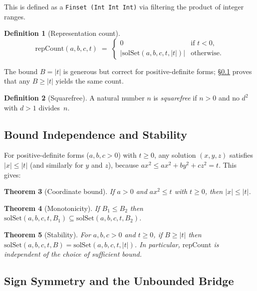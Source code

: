 \documentclass[11pt,a4paper]{article}
\newtheorem{theorem}{Theorem}[section]
\theoremstyle{definition}
\newtheorem{definition}[theorem]{Definition}
\newcommand{\lean}[1]{\texttt{#1}}
\newcommand{\solSet}{\mathrm{solSet}}
\newcommand{\repCount}{\mathrm{repCount}}
\begin{document}
This is defined as a \lean{Finset (Int \texttimes{} Int \texttimes{} Int)}
via filtering the product of integer ranges.

\begin{definition}[Representation count]\label{def:repcount}
\[
  \repCount(a,b,c,t) \;=\;
  \begin{cases}
    0 & \text{if } t < 0,\\
    \bigl|\solSet(a,b,c,t,|t|)\bigr| & \text{otherwise.}
  \end{cases}
\]
\end{definition}

The bound $B = |t|$ is generous but correct for positive-definite
forms; \S\ref{sec:s2} proves that any $B \ge |t|$ yields the same
count.

\begin{definition}[Squarefree]\label{def:sqfree}
A natural number $n$ is \emph{squarefree} if $n > 0$ and no
$d^2$ with $d > 1$ divides~$n$.
\end{definition}

\subsection{Bound Independence and Stability}\label{sec:s2}

For positive-definite forms ($a, b, c > 0$) with $t \ge 0$, any
solution $(x,y,z)$ satisfies $|x| \le |t|$ (and similarly for $y$
and $z$), because $ax^2 \le ax^2 + by^2 + cz^2 = t$.  This gives:

\begin{theorem}[Coordinate bound]\label{thm:coord-bound}
If $a > 0$ and $ax^2 \le t$ with $t \ge 0$, then $|x| \le |t|$.
\end{theorem}

\begin{theorem}[Monotonicity]\label{thm:mono}
If $B_1 \le B_2$ then
$\solSet(a,b,c,t,B_1) \subseteq \solSet(a,b,c,t,B_2)$.
\end{theorem}

\begin{theorem}[Stability]\label{thm:stable}
For $a, b, c > 0$ and $t \ge 0$, if $B \ge |t|$ then
$\solSet(a,b,c,t,B) = \solSet(a,b,c,t,|t|)$.  In particular,
$\repCount$ is independent of the choice of sufficient bound.
\end{theorem}

\subsection{Sign Symmetry and the Unbounded Bridge}\label{sec:s3}
\end{document}

